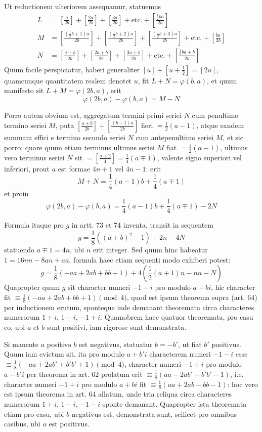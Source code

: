Ut reductionem ulteriorem assequamur, statuemus
\[
\begin{aligned}
L&=\left[\frac{a}{2b}\right]+\left[\frac{2a}{2b}\right]+\left[\frac{3a}{2b}\right]+\text{etc.}+\left[\frac{\frac12ba}{2b}\right]\\
M&=\left[\frac{(\frac12b+1)a}{2b}\right]+\left[\frac{(\frac12b+2)a}{2b}\right]+\left[\frac{(\frac12b+3)a}{2b}\right]+\text{etc.}+\left[\frac{ba}{2b}\right]\\
N&=\left[\frac{a+b}{2b}\right]+\left[\frac{2a+b}{2b}\right]+\left[\frac{3a+b}{2b}\right]+\text{etc.}+\left[\frac{\frac12ba+b}{2b}\right]
\end{aligned}
\]
Quum facile perspiciatur, haberi generaliter $[u]+[u+\frac12]=[2u]$, quamcunque quantitatem realem denotet $u$, fit $L+N=\varphi(b,a)$, et quum manifesto sit $L+M=\varphi(2b,a)$, erit
\[
\varphi(2b,a)-\varphi(b,a)=M-N
\]

Porro autem obvium est, aggregatum termini primi seriei $N$ cum penultimo termino seriei $M$, puta $\left[\frac{a+b}{2b}\right]+\left[\frac{(b-1)a}{2b}\right]$ fieri $=\frac12(a-1)$, atque eandem summam effici e termino secundo seriei $N$ cum antepenultimo seriei $M$, et sic porro: quare quum etiam terminus ultimus seriei $M$ fiat $=\frac12(a-1)$, ultimus vero terminus seriei $N$ sit $=\left[\frac{a+2}{4}\right]=\frac14(a\mp1)$, valente signo superiori vel inferiori, prout $a$ est formae $4n+1$ vel $4n-1$: erit
\[
M+N=\frac14(a-1)b+\frac14(a\mp1)
\]
et proin
\[
\varphi(2b,a)-\varphi(b,a)=\frac14(a-1)b+\frac14(a\mp1)-2N
\]

%
Formula itaque pro $g$ in artt. 73 et 74 inventa, transit in sequentem
\[
g=\frac18((a+b)^2-1)+2n-4N
\]
statuendo $a\mp1=4n$, ubi $n$ erit integer. Sed quum hinc habeatur $1=16nn-8an+aa$, formula haec etiam sequenti modo exhiberi potest:
\[
g=\frac18(-aa+2ab+bb+1)+4(\frac12(a+1)n-nn-N)
\]
Quapropter quum $g$ sit character numeri $-1-i$ pro modulo $a+bi$, hic character fit $\equiv\frac18(-aa+2ab+bb+1)\pmod4$, quod est ipsum theorema supra (art. 64) per inductionem erutum, sponteque inde demanant theoremata circa characteres numerorum $1+i$, $1-i$, $-1+i$. Quamobrem haec quatuor theoremata, pro casu eo, ubi $a$ et $b$ sunt positivi, iam rigorose sunt demonstrata.

Si manente $a$ positivo $b$ est negativus, statuatur $b=-b'$, ut fiat $b'$ positivus. Quum iam evictum sit, ita pro modulo $a+b'i$ characterem numeri $-1-i$ esse $\equiv\frac18(-aa+2ab'+b'b'+1)\pmod4$, character numeri $-1+i$ pro modulo $a-b'i$ per theorema in art. 62 prolatum erit $\equiv\frac18(aa-2ab'-b'b'-1)$, i.e. character numeri $-1+i$ pro modulo $a+bi$ fit $\equiv\frac18(aa+2ab-bb-1)$: hoc vero est ipsum theorema in art. 64 allatum, unde tria reliqua circa characteres numerorum $1+i$, $1-i$, $-1-i$ sponte demanant. Quapropter ista theoremata etiam pro casu, ubi $b$ negativus est, demonstrata sunt, scilicet pro omnibus casibus, ubi $a$ est positivus.

